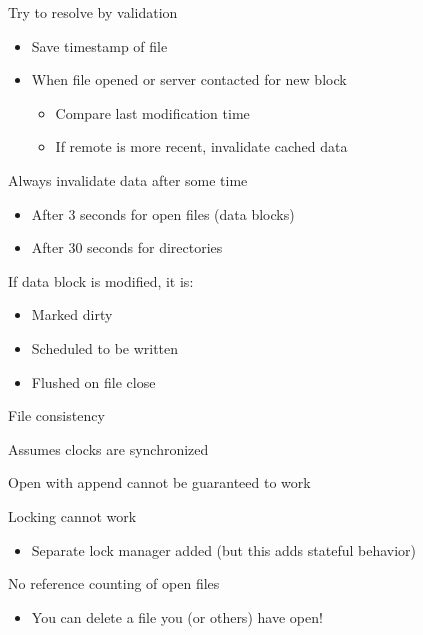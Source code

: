 \begin{slide}
	
	
	Try to resolve by validation
	\begin{itemize}
		\item Save timestamp of file
		\item When file opened or server contacted for new block
		\begin{itemize}
			\item Compare last modification time
			\item If remote is more recent, invalidate cached data
		\end{itemize}
	\end{itemize}
	\bigskip
	
	Always invalidate data after some time
	\begin{itemize}
		\item After 3 seconds for open files (data blocks)
		\item After 30 seconds for directories
	\end{itemize}
	\bigskip
	
	If data block is modified, it is:
	\begin{itemize}
		\item Marked dirty
		\item Scheduled to be written
		\item Flushed on file close
	\end{itemize}
\end{slide}

\begin{slide}

	
	File consistency
	\medskip
	
	Assumes clocks are synchronized
	\medskip
	
	Open with append cannot be guaranteed to work
	\medskip
	
	Locking cannot work
	\begin{itemize}
		\item Separate lock manager added (but this adds stateful behavior)
	\end{itemize}
	\medskip
	
	No reference counting of open files
	\begin{itemize}
		\item You can delete a file you (or others) have open!
	\end{itemize}

\end{slide}

